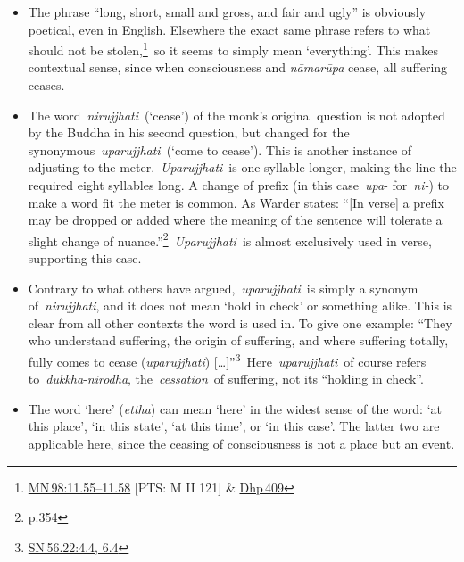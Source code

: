 \documentclass[10pt, openany]{book}
\begin{document}
\begin{itemize}

\itemsep5pt\parskip0pt


\item
The phrase “long, short, small and gross, and fair and ugly” is obviously poetical, even in English. Elsewhere the exact same phrase refers to what should not be stolen,\footnote {\href{https://suttacentral.net/mn98/en/sujato\#11.55}{MN 98:11.55–11.58} [PTS: M II 121] \& \href{https://suttacentral.net/dhp409/en/sujato}{Dhp 409}} so it seems to simply mean ‘everything’. This makes contextual sense, since when consciousness and \textit{nāmarūpa} cease, all suffering ceases.



\item
The word \textit{nirujjhati} (‘cease’) of the monk’s original question is not adopted by the Buddha in his second question, but changed for the synonymous \textit{uparujjhati} (‘come to cease’). This is another instance of adjusting to the meter. \textit{Uparujjhati} is one syllable longer, making the line the required eight syllables long. A change of prefix (in this case \textit{upa}- for \textit{ni-}) to make a word fit the meter is common. As Warder states: “[In verse] a prefix may be dropped or added where the meaning of the sentence will tolerate a slight change of nuance.”\footnote {\cite{Warder} p.354} \textit{Uparujjhati} is almost exclusively used in verse, supporting this case.



\item
Contrary to what others have argued, \textit{uparujjhati} is simply a synonym of \textit{nirujjhati}, and it does not mean ‘hold in check’ or something alike. This is clear from all other contexts the word is used in. To give one example: “They who understand suffering, the origin of suffering, and where suffering totally, fully comes to cease (\textit{uparujjhati}) […]”\footnote {\href{https://suttacentral.net/sn56.22/en/sujato\#4.4}{SN 56.22:4.4, 6.4}} Here \textit{uparujjhati} of course refers to \textit{dukkha}-\textit{nirodha}, the \textit{cessation} of suffering, not its “holding in check”.



\item
The word ‘here’ (\textit{ettha}) can mean ‘here’ in the widest sense of the word: ‘at this place’, ‘in this state’, ‘at this time’, or ‘in this case’. The latter two are applicable here, since the ceasing of consciousness is not a place but an event.





\end{itemize}
\end{document}
